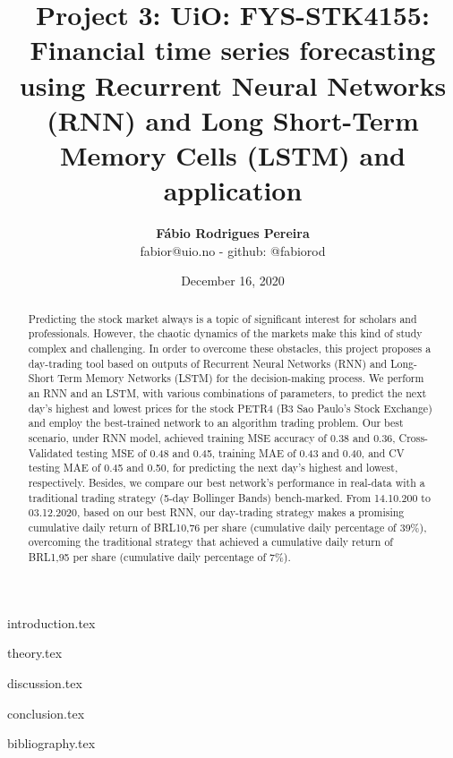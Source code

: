 \documentclass{article}
\title{Project 3: UiO: FYS-STK4155: Financial time series forecasting using Recurrent Neural Networks (RNN) and Long Short-Term Memory Cells (LSTM) and application}
\author{\textbf{Fábio Rodrigues Pereira} \\ \small fabior@uio.no - github: @fabiorod}
\date{December 16, 2020}
\begin{document}
\maketitle
\begin{abstract}
\noindent Predicting the stock market always is a topic of significant interest for scholars and professionals. However, the chaotic dynamics of the markets make this kind of study complex and challenging. In order to overcome these obstacles, this project proposes a day-trading tool based on outputs of Recurrent Neural Networks (RNN) and Long-Short Term Memory Networks (LSTM) for the decision-making process. We perform an RNN and an LSTM, with various combinations of parameters, to predict the next day's highest and lowest prices for the stock PETR4 (B3 Sao Paulo's Stock Exchange) and employ the best-trained network to an algorithm trading problem. Our best scenario, under RNN model, achieved training MSE accuracy of 0.38 and 0.36, Cross-Validated testing MSE of 0.48 and 0.45, training MAE of 0.43 and 0.40, and CV testing MAE of 0.45 and 0.50, for predicting the next day's highest and lowest, respectively. Besides, we compare our best network's performance in real-data with a traditional trading strategy (5-day Bollinger Bands) bench-marked. From 14.10.200 to 03.12.2020, based on our best RNN, our day-trading strategy makes a promising cumulative daily return of BRL10,76 per share (cumulative daily percentage of 39\%), overcoming the traditional strategy that achieved a cumulative daily return of BRL1,95 per share (cumulative daily percentage of 7\%).
\end{abstract}

\clearpage
\thispagestyle{empty}

\tableofcontents

\clearpage
\thispagestyle{empty}

{introduction.tex}

\clearpage
\thispagestyle{empty}

{theory.tex}

\clearpage
\thispagestyle{empty}

{discussion.tex}

\clearpage
\thispagestyle{empty}

{conclusion.tex}

\clearpage
\thispagestyle{empty}

{bibliography.tex}
\end{document}
